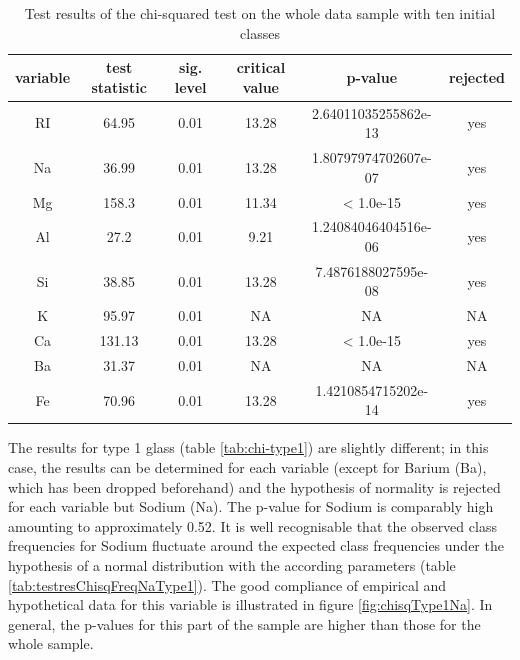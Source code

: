 \documentclass[a4paper, 12pt, titlepage, headsepline, listof = totoc, bibliography = totoc, numbers = noenddot]{scrartcl}
\begin{document}
\begin{table}[h!]
\centering
\begin{tabular}{|cccccc|} \hline variable & test statistic & sig. level & critical value & p-value & rejected\\ \hline RI & 64.95 & 0.01 & 13.28 & 2.64011035255862e-13 & yes\\ 
Na & 36.99 & 0.01 & 13.28 & 1.80797974702607e-07 & yes\\ 
Mg & 158.3 & 0.01 & 11.34 & < 1.0e-15 & yes\\ 
Al & 27.2 & 0.01 & 9.21 & 1.24084046404516e-06 & yes\\ 
Si & 38.85 & 0.01 & 13.28 & 7.4876188027595e-08 & yes\\ 
K & 95.97 & 0.01 & NA & NA & NA\\ 
Ca & 131.13 & 0.01 & 13.28 & < 1.0e-15 & yes\\ 
Ba & 31.37 & 0.01 & NA & NA & NA\\ 
Fe & 70.96 & 0.01 & 13.28 & 1.4210854715202e-14 & yes\\ \hline \end{tabular}\caption{Test results of the chi-squared test on the whole data sample with ten initial classes}
\label{tab:chi-full}
\end{table}

The results for type 1 glass (table \ref{tab:chi-type1}) are slightly different; in this case, the results can be determined for each variable (except for Barium (Ba), which has been dropped beforehand) and the hypothesis of normality is rejected for each variable but Sodium (Na). The p-value for Sodium is comparably high amounting to approximately 0.52. It is well recognisable that the observed class frequencies for Sodium fluctuate around the expected class frequencies under the hypothesis of a normal distribution with the according parameters (table \ref{tab:testresChisqFreqNaType1}). The good compliance of empirical and hypothetical data for this variable is illustrated in figure \ref{fig:chisqType1Na}. In general, the p-values for this part of the sample are higher than those for the whole sample.
\end{document}
